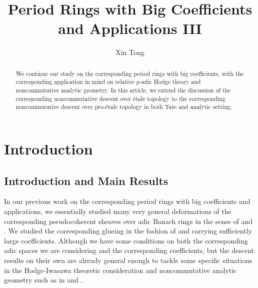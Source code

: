 \documentclass[12pt]{amsart}
\theoremstyle{definition}
\numberwithin{equation}{section}
\begin{document}
\normalfont



\title{Period Rings with Big Coefficients and Applications III}
\author{Xin Tong} 



\maketitle


\begin{abstract}
\rm We continue our study on the corresponding period rings with big coefficients, with the corresponding application in mind on relative $p$-adic Hodge theory and noncommutative analytic geometry. In this article, we extend the discussion of the corresponding noncommutative descent over \'etale topology to the corresponding noncommutative descent over pro-\'etale topology in both Tate and analytic setting. 
\end{abstract}





\tableofcontents





\section{Introduction}



\subsection{Introduction and Main Results}


\noindent In our previous work on the corresponding period rings with big coefficients and applications, we essentially studied many very general deformations of the corresponding pseudocoherent sheaves over adic Banach rings in the sense of \cite{KL1} and \cite{KL2}. We studied the corresponding glueing in the fashion of \cite{KL1} and \cite{KL2} carrying sufficiently large coefficients. Although we have some conditions on both the corresponding adic spaces we are considering and the corresponding coefficients, but the descent results on their own are already general enough to tackle some specific situations in the Hodge-Iwasawa theoretic consideration and noncommutative analytic geometry such as in \cite{TX3} and \cite{TX4}.
\end{document}
